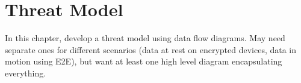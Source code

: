 \chapter{Threat Model}
\label{chap-threatmodel}

In this chapter, develop a threat model using data flow diagrams. May need separate ones for different scenarios (data
at rest on encrypted devices, data in motion using E2E), but want at least one high level diagram encapsulating
everything.


